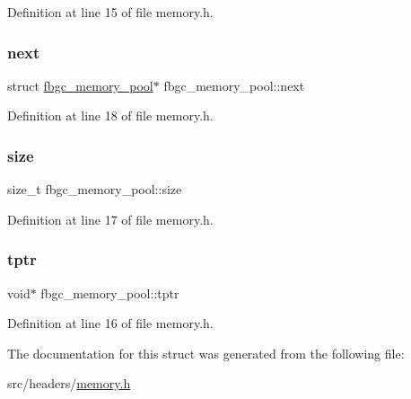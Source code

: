 Definition at line 15 of file memory.\+h.

\mbox{\label{structfbgc__memory__pool_a6ffafbe2e1fd8d773d8e2130cdf7a36c}} 
\subsubsection{\texorpdfstring{next}{next}}
{\footnotesize\ttfamily struct \hyperlink{structfbgc__memory__pool}{fbgc\+\_\+memory\+\_\+pool}$\ast$ fbgc\+\_\+memory\+\_\+pool\+::next}



Definition at line 18 of file memory.\+h.

\mbox{\label{structfbgc__memory__pool_a9ed0b42e3a4c3c2022e21f7e84b5afc0}} 
\subsubsection{\texorpdfstring{size}{size}}
{\footnotesize\ttfamily size\+\_\+t fbgc\+\_\+memory\+\_\+pool\+::size}



Definition at line 17 of file memory.\+h.

\mbox{\label{structfbgc__memory__pool_acef6b14cab29711ac7d0736c9e33662b}} 
\subsubsection{\texorpdfstring{tptr}{tptr}}
{\footnotesize\ttfamily void$\ast$ fbgc\+\_\+memory\+\_\+pool\+::tptr}



Definition at line 16 of file memory.\+h.



The documentation for this struct was generated from the following file\+:\begin{DoxyCompactItemize}
\item 
src/headers/\hyperlink{memory_8h}{memory.\+h}\end{DoxyCompactItemize}
